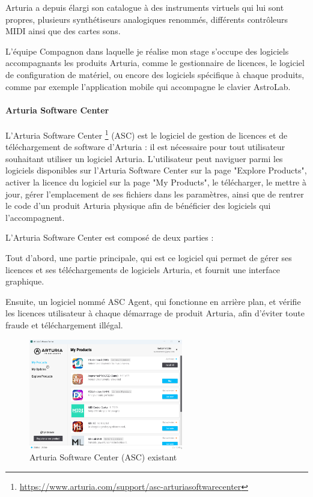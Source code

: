 \documentclass[francais]{rapportPFE}  %
\begin{document}
Arturia a depuis élargi son catalogue à des instruments virtuels qui lui sont propres, plusieurs synthétiseurs analogiques renommés, différents contrôleurs MIDI ainsi que des cartes sons. 

L’équipe Compagnon dans laquelle je réalise mon stage s’occupe des logiciels accompagnants les produits Arturia, comme le gestionnaire de licences, le logiciel de configuration de matériel, ou encore des logiciels spécifique à chaque produits, comme par exemple l'application mobile qui accompagne le clavier AstroLab. 

\paragraph{Arturia Software Center}
L’Arturia Software Center
\footnote{\url{https://www.arturia.com/support/asc-arturiasoftwarecenter}}
 (ASC) est le logiciel de gestion de licences et de
téléchargement de software d’Arturia : il est nécessaire pour tout utilisateur
souhaitant utiliser un logiciel Arturia. L'utilisateur peut naviguer parmi les logiciels disponibles sur l'Arturia Software Center sur la page "Explore Products", activer la licence du logiciel sur la page "My Products", le télécharger, le mettre à jour, gérer l'emplacement de ses fichiers dans les paramètres, ainsi que de rentrer le code d'un produit Arturia physique afin de bénéficier des logiciels qui l'accompagnent.

L’Arturia Software Center est composé de deux parties : 

Tout d'abord, une partie principale, qui est ce logiciel qui permet de gérer ses licences et ses téléchargements de logiciels Arturia, et fournit une interface graphique.

Ensuite, un logiciel nommé ASC Agent, qui fonctionne en arrière plan, et vérifie les licences utilisateur à chaque démarrage de produit Arturia, afin d'éviter toute fraude et téléchargement illégal.

\begin{figure}[!t]
	\centering
	\includegraphics[width=0.6\textwidth]{graphics/asc_existant.png}
	\begin{tiny}
	\end{tiny}
	\caption{Arturia Software Center (ASC) existant}
	\label{fig:Expe}
\end{figure}
\end{document}
